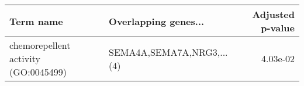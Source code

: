 \begin{tabular}{llr}
\toprule
                           Term name &      Overlapping genes... &  Adjusted p-value \\
\midrule
chemorepellent activity (GO:0045499) & SEMA4A,SEMA7A,NRG3,...(4) &          4.03e-02 \\
\bottomrule
\end{tabular}
